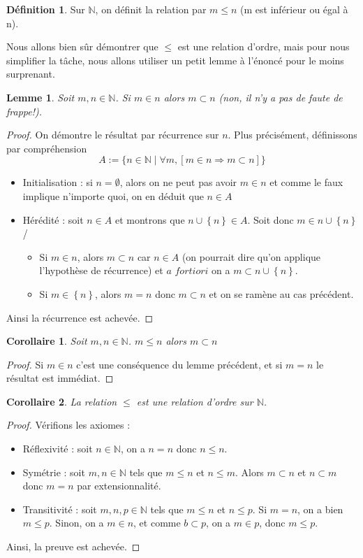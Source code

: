 \documentclass[french]{book}
\newcommand{\N}{\mathbb{N}}
\theoremstyle{plain}
\newtheorem{lem}{Lemme}[chapter]
\newtheorem{cor}{Corollaire}[chapter]
\theoremstyle{definition}
\newtheorem{dfn}{Définition}[chapter]
\theoremstyle{remark}
\begin{document}
\begin{dfn}
	Sur $\mathbb{N}$, on définit la relation par $m \leqslant n$ (m est inférieur ou égal à n).
\end{dfn}

Nous allons bien sûr démontrer que $\leqslant$ est une relation d'ordre, mais pour nous simplifier la tâche, nous allons utiliser un petit lemme à l'énoncé pour le moins surprenant.

\begin{lem}
	Soit $m, n \in \mathbb{N}$. Si $m \in n$ alors $m \subset n$ (non, il n'y a pas de faute de frappe!).
\end{lem}
\begin{proof}
	On démontre le résultat par récurrence sur $n$. Plus précisément, définissons par compréhension $$A := \{n \in \mathbb{N} \mid \forall m, [m \in n \Rightarrow m \subset n] \}$$
	\begin{itemize}
		\item Initialisation : si $n=\emptyset$, alors on ne peut pas avoir $m\in n$ et comme le faux implique n'importe quoi, on en déduit que $n\in A$
		\item Hérédité : soit $n\in A$ et montrons que $n\cup\left\{n\right\}\in A$. Soit donc $m\in n\cup\left\{n\right\}$/
		\begin{itemize}
			\item[--] Si $m\in n$, alors $m\subset n$ car $n\in A$ (on pourrait dire qu'on applique l'hypothèse de récurrence) et $a$ $fortiori$ on a $m\subset n\cup\left\{n\right\}$.
			\item[--] Si $m\in\left\{n\right\}$, alors $m=n$ donc $m\subset n$ et on se ramène au cas précédent.
		\end{itemize}
	\end{itemize}
	Ainsi la récurrence est achevée.
\end{proof}
\begin{cor}
	Soit $m, n \in \mathbb{N}$. $m \leqslant n$ alors $m \subset n$
\end{cor}
\begin{proof}
	Si $m\in n$ c'est une conséquence du lemme précédent, et si $m=n$ le résultat est immédiat.
\end{proof}
\begin{cor}
	La relation $\leqslant$ est une relation d'ordre sur $\N$.
\end{cor}
\begin{proof}
	Vérifions les axiomes : 
	\begin{itemize}
		\item Réflexivité : soit $n\in\N$, on a $n=n$ donc $n\leqslant n$.
		\item Symétrie : soit $m,n\in\N$ tels que $m\leqslant n$ et $n\leqslant m$. Alors $m\subset n$ et $n\subset m$ donc $m=n$ par extensionnalité.
		\item Transitivité : soit $m,n,p\in\N$ tels que $m\leqslant n$ et $n\leqslant p$. Si $m=n$, on a bien $m\leqslant p$. Sinon, on a $m\in n$, et comme $b\subset p$, on a $m\in p$, donc $m\leqslant p$.
	\end{itemize}
	Ainsi, la preuve est achevée.
\end{proof}
\end{document}
